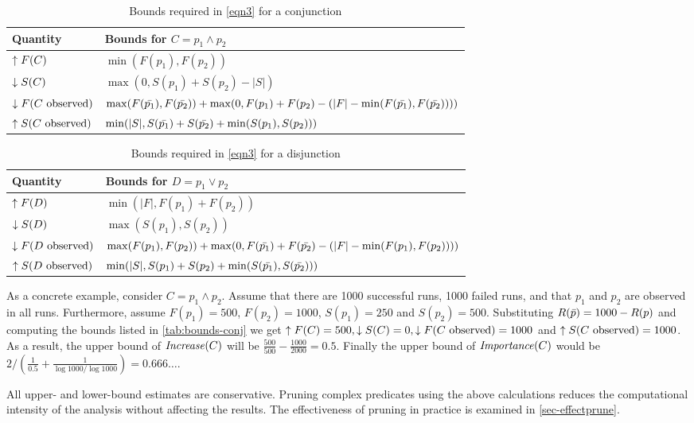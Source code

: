 \begin{table*}
  \caption{Bounds required in \autoref{eqn3} for a conjunction}
  \label{tab:bounds-conj}
  \centering
  \begin{tabular}{ll}
    \toprule
    Quantity & Bounds for $C = p_1 \wedge p_2$ \\
    \midrule
    $\uparrow F(C) $
      &
      $\min(F(p_1), F(p_2))$
      \\
    $\downarrow S(C)$
      &
      $\max(0, S(p_1) + S(p_2) - |S|)$
      \\
    $\downarrow F(\text{$C$ observed})$
      &
      $\max(F(\text{$\bar{p_1}$}), F(\text{$\bar{p_2}$})) +
      \max(0, F(p_1) + F(p_2) - (|F| - \min(F(\text{$\bar{p_1}$}), F(\text{$\bar{p_2}$}))))$
      \\
    $\uparrow S(\text{$C$ observed})$
      &
      $\min(|S|, S(\text{$\bar{p_1}$}) + S(\text{$\bar{p_2}$}) + \min(S(p_1), S(p_2)))$
      \\
      \bottomrule
  \end{tabular}
\end{table*}

\begin{table*}
  \caption{Bounds required in \autoref{eqn3} for a disjunction}
  \label{tab:bounds-disj}
  \centering
  \begin{tabular}{ll}
    \toprule
    Quantity & Bounds for $D = p_1 \vee p_2$ \\
    \midrule
    $\uparrow F(D) $
      &
      $\min(|F|, F(p_1) + F(p_2))$
      \\
    $\downarrow S(D)$
      &
      $\max(S(p_1), S(p_2))$
      \\
    $\downarrow F(\text{$D$ observed})$
      &
      $\max(F(p_1), F(p_2)) +
      \max(0, F(\text{$\bar{p_1}$}) + F(\text{$\bar{p_2}$}) - (|F| - \min(F(p_1), F(p_2))))$
      \\
    $\uparrow S(\text{$D$ observed})$
      &
      $\min(|S|, S(p_1) + S(p_2) + \min(S(\text{$\bar{p_1}$}), S(\text{$\bar{p_2}$})))$
      \\
      \bottomrule
  \end{tabular}
\end{table*}

As a concrete example, consider $C = p_1 \wedge p_2$.  Assume that there are 1000
successful runs, 1000 failed runs, and that $p_1$ and $p_2$ are observed in all runs.
Furthermore, assume
$F(p_1) = 500$, $F(p_2) = 1000$, $S(p_1) = 250$ and $S(p_2) = 500$.
Substituting $R(\text{$\bar{p}$}) = 1000 - R(p)$ and computing the bounds listed in
\autoref{tab:bounds-conj} we get $\uparrow F(C) = 500, \downarrow S(C) = 0, \downarrow F(\text{$C$ observed}) = 1000$ and
$\uparrow S(\text{$C$ observed}) = 1000$.  As a result, the upper bound of $\mathit{Increase}(C)$ will be
$\frac{500}{500} - \frac{1000}{2000}=0.5$. Finally the upper bound of $\mathit{Importance}(C)$ would be $2 / (\frac{1}{0.5}+\frac{1}{\log{1000}/\log{1000}}) = 0.666\dots$.

All upper- and lower-bound estimates are conservative.  Pruning complex predicates using the above calculations reduces the computational intensity of the analysis without affecting the results.  The effectiveness of pruning in practice is examined in \autoref{sec-effectprune}.
